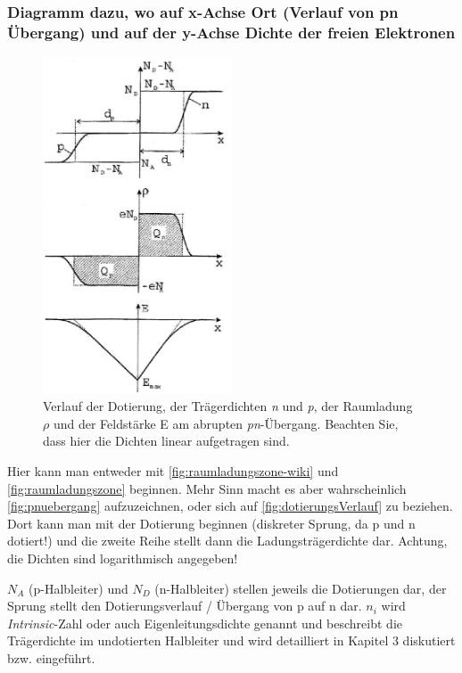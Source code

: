 	\subsubsection{Diagramm dazu, wo auf x-Achse Ort (Verlauf von pn Übergang) und auf der y-Achse Dichte der freien Elektronen}
       \begin{figure}[H]
        \centering
        \includegraphics[width=0.5\textwidth]{fig/dotierungsVerlauf}
        \caption{Verlauf der Dotierung, der Trägerdichten \textit{n} und \textit{p}, der Raumladung $\rho$ und der Feldstärke E am abrupten \textit{pn}-Übergang. Beachten Sie, dass hier die Dichten linear aufgetragen sind.}
        \label{fig:dotierungsVerlauf}
    \end{figure}

	Hier kann man entweder mit \autoref{fig:raumladungszone-wiki} und \autoref{fig:raumladungszone} beginnen.
	Mehr Sinn macht es aber wahrscheinlich \autoref{fig:pnuebergang} aufzuzeichnen, oder sich auf \autoref{fig:dotierungsVerlauf} zu beziehen. 
	Dort kann man mit der Dotierung beginnen (diskreter Sprung, da p und n dotiert!) und die zweite Reihe stellt dann die Ladungsträgerdichte dar. Achtung, die Dichten sind logarithmisch angegeben!
	
	$N_A$ (p-Halbleiter) und $N_D$ (n-Halbleiter) stellen jeweils die Dotierungen dar, der Sprung stellt den Dotierungsverlauf / Übergang von p auf n dar.
	$n_i$ wird \textit{Intrinsic}-Zahl oder auch Eigenleitungsdichte genannt und beschreibt die Trägerdichte im undotierten Halbleiter und wird detailliert in Kapitel 3 diskutiert bzw. eingeführt. 
	
